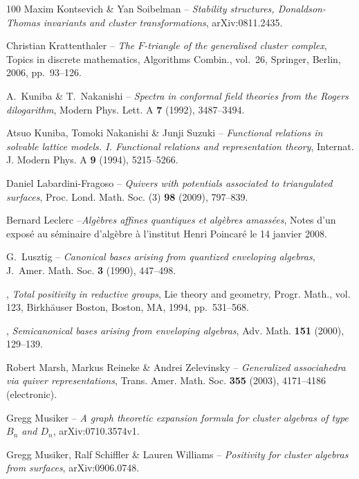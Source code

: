 \documentclass[brochure,12pt]{bourbaki}
\numberwithin{equation}{subsection}
\numberwithin{theorem}{section}
\begin{document}
\begin{thebibliography}{100}
{\sc Maxim Kontsevich \& Yan Soibelman} -- \emph{Stability structures,
  {D}onaldson-{T}homas invariants and cluster transformations},
  arXiv:0811.2435.

{\sc Christian Krattenthaler} -- \emph{The {$F$}-triangle of the generalised cluster
  complex}, Topics in discrete mathematics, Algorithms Combin., vol.~26,
  Springer, Berlin, 2006, pp.~93--126.

{\sc A.~Kuniba \& T.~Nakanishi} -- \emph{Spectra in conformal field theories from the
  {R}ogers dilogarithm}, Modern Phys. Lett. A \textbf{7} (1992), 
  3487--3494.

{\sc Atsuo Kuniba, Tomoki Nakanishi \& Junji Suzuki} -- \emph{Functional relations in
  solvable lattice models. {I}. {F}unctional relations and representation
  theory}, Internat. J. Modern Phys. A \textbf{9} (1994), 5215--5266.


{\sc Daniel Labardini-Fragoso} -- \emph{Quivers with potentials associated to
  triangulated surfaces}, Proc. Lond. Math. Soc. (3) \textbf{98} (2009), 
  797--839.

{\sc Bernard Leclerc} --\emph{Alg\`ebres affines quantiques et alg\`ebres amass\'ees},
Notes d'un expos\'e au s\'eminaire d'alg\`ebre \`a l'institut Henri Poincar\'e le
14 janvier 2008.

{\sc G.~Lusztig} -- \emph{Canonical bases arising from quantized enveloping algebras},
  J.~Amer. Math. Soc. \textbf{3} (1990), 447--498.

\bysame, \emph{Total positivity in reductive groups}, Lie theory and geometry,
  Progr. Math., vol. 123, Birkh\"auser Boston, Boston, MA, 1994, pp.~531--568.

\bysame, \emph{Semicanonical bases arising from enveloping algebras}, Adv.
  Math. \textbf{151} (2000), 129--139.

{\sc Robert Marsh, Markus Reineke \& Andrei Zelevinsky} -- \emph{Generalized
  associahedra via quiver representations}, Trans. Amer. Math. Soc.
  \textbf{355} (2003), 4171--4186 (electronic).

{\sc Gregg Musiker} -- \emph{A graph theoretic expansion formula for cluster algebras
  of type {$B_n$ and $D_n$}}, arXiv:0710.3574v1.

{\sc Gregg Musiker, Ralf Schiffler \& Lauren Williams} -- \emph{Positivity for
  cluster algebras from surfaces}, arXiv:0906.0748.


\end{thebibliography}
\end{document}
